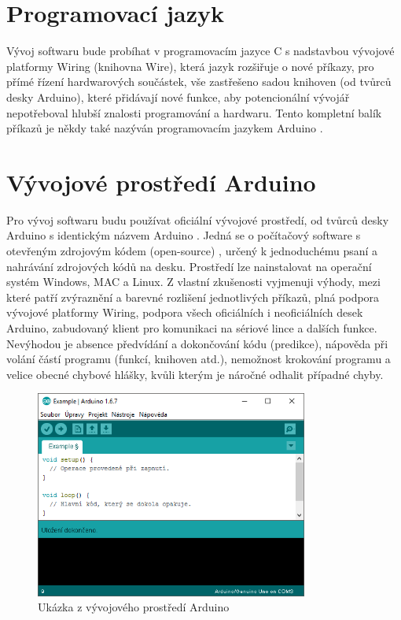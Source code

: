 \documentclass[FM,BP]{tulthesis}  %
\begin{document}
\section{Programovací jazyk}
Vývoj softwaru bude probíhat v programovacím jazyce C s nadstavbou vývojové platformy Wiring  (knihovna Wire)\cite{Arduino acce}, která jazyk rozšiřuje o nové příkazy, pro přímé řízení hardwarových součástek, vše zastřešeno sadou knihoven \cite{Arduino lib} (od tvůrců desky Arduino), které přidávají nové funkce, aby potencionální vývojář nepotřeboval hlubší znalosti programování a hardwaru. Tento kompletní balík příkazů \cite{Arduino lang} je někdy také nazýván programovacím jazykem Arduino \cite{Arduino intro}.

\section{Vývojové prostředí Arduino}
Pro vývoj softwaru budu používat oficiální vývojové prostředí, od tvůrců desky Arduino s identickým názvem Arduino \cite{Arduino soft}. Jedná se o počítačový software s otevřeným zdrojovým kódem (open-source) \cite{Arduino source}, určený k jednoduchému psaní a nahrávání zdrojových kódů na desku. Prostředí lze nainstalovat na operační systém Windows, MAC a Linux. Z vlastní zkušenosti vyjmenuji výhody, mezi které patří zvýraznění a barevné rozlišení jednotlivých příkazů, plná podpora vývojové platformy Wiring, podpora všech oficiálních i neoficiálních desek Arduino, zabudovaný klient pro komunikaci na sériové lince a dalších funkce. Nevýhodou je absence předvídání a dokončování kódu (predikce), nápověda při volání částí programu (funkcí, knihoven atd.), nemožnost krokování programu a velice obecné chybové hlášky, kvůli kterým je náročné odhalit případné chyby.

\begin{figure}[H]
\begin{center}
\includegraphics[width=0.8\textwidth]{images/arduino-ide.png}
\caption{Ukázka z vývojového prostředí Arduino}
\label{image}
\end{center}
\end{figure}
\end{document}
